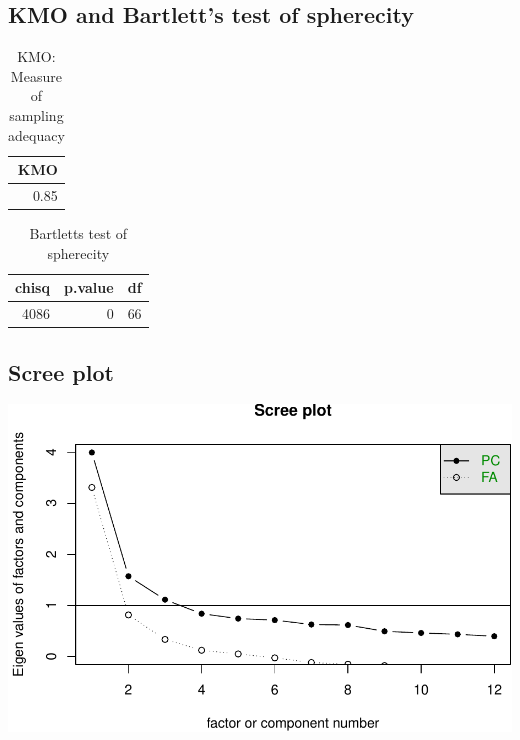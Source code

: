 \documentclass[]{article}
\begin{document}
\hypertarget{kmo-and-bartletts-test-of-spherecity-2}{%
\subsection{KMO and Bartlett's test of
spherecity}\label{kmo-and-bartletts-test-of-spherecity-2}}

\begin{table}[H]

\caption{\label{tab:unnamed-chunk-14}KMO: Measure of sampling adequacy}
\centering
\fontsize{6}{8}\selectfont
\begin{tabular}[t]{r}
\toprule
KMO\\
\midrule
0.85\\
\bottomrule
\end{tabular}
\end{table}

\begin{table}[H]

\caption{\label{tab:unnamed-chunk-14}Bartletts test of spherecity}
\centering
\fontsize{6}{8}\selectfont
\begin{tabular}[t]{rrr}
\toprule
chisq & p.value & df\\
\midrule
4086 & 0 & 66\\
\bottomrule
\end{tabular}
\end{table}

\hypertarget{scree-plot-2}{%
\subsection{Scree plot}\label{scree-plot-2}}

\includegraphics{PCA_covid_files/figure-latex/unnamed-chunk-15-1.pdf}
\end{document}
